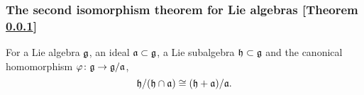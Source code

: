 \subsubsection{The second isomorphism theorem for Lie algebras [Theorem \ref{the-second-isomorphism-theorem-for-lie-algebras}]}\label{the-second-isomorphism-theorem-for-lie-algebras}
For a Lie algebra $\mathfrak{g}$, an ideal $\mathfrak{a} \subset \mathfrak{g}$, a Lie subalgebra $\mathfrak{h} \subset \mathfrak{g}$ and the canonical homomorphism $\varphi \colon \mathfrak{g} \to \mathfrak{g} / \mathfrak{a}$,
\[
\mathfrak{h} / (\mathfrak{h} \cap \mathfrak{a}) \cong (\mathfrak{h} + \mathfrak{a})/\mathfrak{a}.
\]